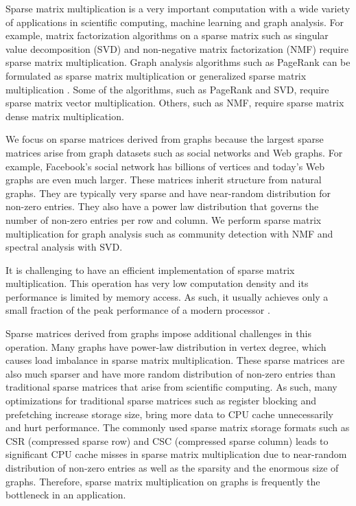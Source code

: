 Sparse matrix multiplication is a very important computation with a wide variety
of applications in scientific computing, machine learning and graph analysis.
For example, matrix factorization algorithms on a sparse matrix such as
singular value decomposition (SVD) \cite{svd} and non-negative matrix
factorization (NMF) \cite{nmf} require sparse matrix multiplication.
Graph analysis algorithms such as PageRank \cite{pagerank} can be
formulated as sparse matrix multiplication or generalized sparse matrix
multiplication \cite{Mattson13}. Some of
the algorithms, such as PageRank and SVD, require sparse matrix vector
multiplication. Others, such as NMF, require sparse matrix dense
matrix multiplication.

We focus on sparse matrices derived from graphs because the largest sparse
matrices arise from graph datasets such as social networks and Web graphs.
For example, Facebook's social network has billions of vertices and
today's Web graphs are even much larger. These matrices inherit structure
from natural graphs. They are typically very sparse and have near-random
distribution for non-zero entries. They also have a power law distribution
that governs the number of non-zero entries per row and column.
We perform sparse matrix multiplication for graph
analysis such as community detection with NMF and spectral analysis with SVD.


It is challenging to have an efficient implementation of sparse matrix
multiplication. This operation has very low computation density and its
performance is limited by memory access. As such, it usually achieves only
a small fraction of the peak performance of a modern processor \cite{Williams07}.

Sparse matrices derived from graphs impose additional challenges in
this operation. Many graphs have power-law distribution in vertex
degree, which causes load imbalance in sparse matrix multiplication. These
sparse matrices are also much sparser and have more random distribution of
non-zero entries than traditional sparse matrices that arise from scientific
computing. As such, many optimizations for traditional sparse matrices such
as register blocking and prefetching \cite{Williams07} increase storage size,
bring more data to CPU cache unnecessarily and hurt performance.
The commonly used sparse matrix storage formats such as CSR (compressed sparse
row) and CSC (compressed sparse column) leads to significant CPU cache misses
in sparse matrix multiplication due to near-random distribution of non-zero
entries as well as the sparsity and the enormous size of graphs. 
Therefore, sparse matrix multiplication on graphs is frequently the bottleneck
in an application.

